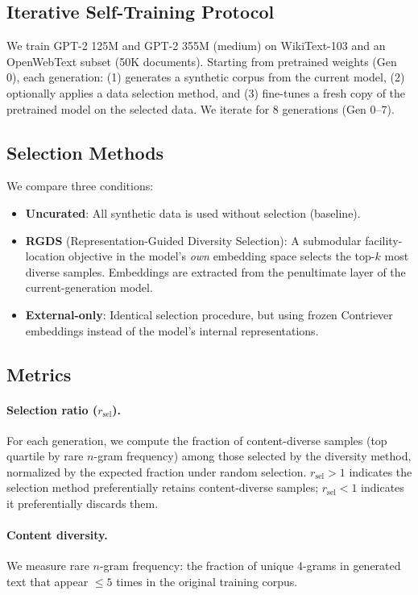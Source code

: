 \documentclass[11pt,a4paper]{article}
\newcommand{\ratio}{\ensuremath{r_{\text{sel}}}}
\begin{document}
\subsection{Iterative Self-Training Protocol}

We train GPT-2 125M and GPT-2 355M (medium) on WikiText-103 \cite{merity2016pointer} and an OpenWebText subset (50K documents).
Starting from pretrained weights (Gen 0), each generation:
(1) generates a synthetic corpus from the current model,
(2) optionally applies a data selection method, and
(3) fine-tunes a fresh copy of the pretrained model on the selected data.
We iterate for 8 generations (Gen 0--7).

\subsection{Selection Methods}

We compare three conditions:
\begin{itemize}
\item \textbf{Uncurated}: All synthetic data is used without selection (baseline).
\item \textbf{RGDS} (Representation-Guided Diversity Selection): A submodular facility-location objective in the model's \emph{own} embedding space selects the top-$k$ most diverse samples. Embeddings are extracted from the penultimate layer of the current-generation model.
\item \textbf{External-only}: Identical selection procedure, but using frozen Contriever \cite{izacard2022contriever} embeddings instead of the model's internal representations.
\end{itemize}

\subsection{Metrics}

\paragraph{Selection ratio ($\ratio$).}
For each generation, we compute the fraction of content-diverse samples (top quartile by rare $n$-gram frequency) among those selected by the diversity method, normalized by the expected fraction under random selection.
$\ratio > 1$ indicates the selection method preferentially retains content-diverse samples; $\ratio < 1$ indicates it preferentially discards them.

\paragraph{Content diversity.}
We measure rare $n$-gram frequency: the fraction of unique 4-grams in generated text that appear $\leq 5$ times in the original training corpus.
\end{document}
